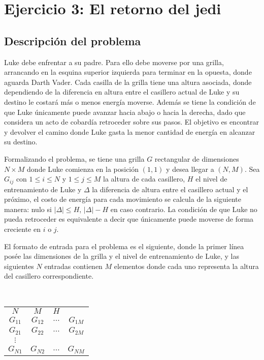 \section{Ejercicio 3: El retorno del jedi}

    \subsection{Descripción del problema}

	Luke debe enfrentar a su padre. Para ello debe moverse por una grilla,
	arrancando en la esquina superior izquierda para terminar en la opuesta,
	donde aguarda Darth Vader. Cada casilla de la grilla tiene una altura
	asociada, donde dependiendo de la diferencia en altura entre el casillero
	actual de Luke y su destino le costará más o menos energía moverse. Además
	se tiene la condición de que Luke únicamente puede avanzar hacia abajo o
	hacia la derecha, dado que considera un acto de cobardía retroceder sobre
	sus pasos. El objetivo es encontrar y devolver el camino donde Luke gasta la
	menor cantidad de energía en alcanzar su destino.

	Formalizando el problema, se tiene una grilla $G$ rectangular de dimensiones $N \times
	M$ donde Luke comienza en la posición $(1, 1)$ y desea llegar a $(N, M)$.
	Sea $G_{ij}$ con $1 \leq i \leq N$ y $1 \leq j \leq M$ la altura de cada
	casillero, $H$ el nivel de entrenamiento de Luke y $\Delta$ la
	diferencia de altura entre el casillero actual y el próximo, el costo de
	energía para cada movimiento se calcula de la siguiente manera: nulo si $|\Delta|
	\leq H$, $|\Delta| - H$ en caso contrario. La condición de que Luke no pueda
	retroceder es equivalente a decir que únicamente puede moverse de forma
	creciente en $i$ o $j$.

	El formato de entrada para el problema es el siguiente, donde la primer
	línea posée las dimensiones de la grilla y el nivel de entrenamiento de
	Luke, y las siguientes $N$ entradas contienen $M$ elementos donde cada uno
	representa la altura del casillero correspondiente.

	~

	\begin{tabular}{cccc}
		$N$ & $M$ & $H$ & \\
		$G_{11}$ & $G_{12}$ & $\dots$ & $G_{1M}$ \\
		$G_{21}$ & $G_{22}$ & $\dots$ & $G_{2M}$ \\
		$\vdots$ & & & \\
		$G_{N1}$ & $G_{N2}$ & $\dots$ & $G_{NM}$ \\
	\end{tabular}

